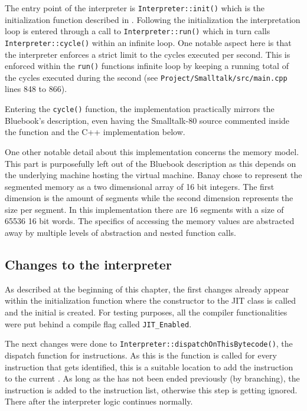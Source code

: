The entry point of the interpreter is \texttt{Interpreter::init()} which is the initialization function described in . Following the initialization the interpretation loop is entered through a call to \texttt{Interpreter::run()} which in turn calls \texttt{Interpreter::cycle()} within an infinite loop. One notable aspect here is that the interpreter enforces a strict limit to the cycles executed per second. This is enforced within the \texttt{run()} functions infinite loop by keeping a running total of the cycles executed during the second (see \texttt{Project/Smalltalk/src/main.cpp} lines 848 to 866). 

Entering the \texttt{cycle()} function, the implementation practically mirrors the Bluebook's description, even having the Smalltalk-80 source commented inside the function and the C++ implementation below. 

One other notable detail about this implementation concerns the memory model. This part is purposefully left out of the Bluebook description as this depends on the underlying machine hosting the virtual machine. Banay chose to represent the segmented memory as a two dimensional array of 16 bit integers. The first dimension is the amount of segments while the second dimension represents the size per segment. In this implementation there are 16 segments with a size of 65536 16 bit words. The specifics of accessing the memory values are abstracted away by multiple levels of abstraction and nested function calls. 

\subsection{Changes to the interpreter}
As described at the beginning of this chapter, the first changes already appear within the initialization function where the constructor to the JIT class is called and the initial \bb{} is created. For testing purposes, all the \jit{} compiler functionalities were put behind a compile flag called \texttt{JIT\_Enabled}. 

The next changes were done to \texttt{Interpreter::dispatchOnThisBytecode()}, the dispatch function for instructions. As this is the function is called for every instruction that gets identified, this is a suitable location to add the instruction to the current \bb{}. As long as the \bb{} has not been ended previously (by branching), the instruction is added to the \bbs{} instruction list, otherwise this step is getting ignored. There after the interpreter logic continues normally. 

